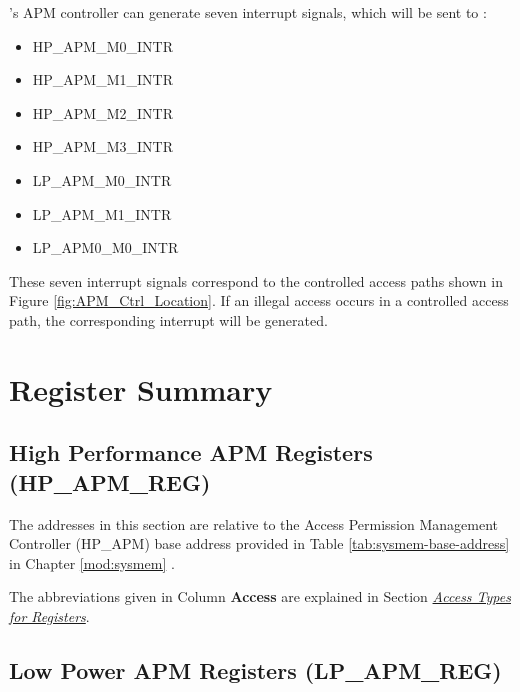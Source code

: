 \documentclass[main\_\_EN.tex]{subfiles}
\begin{document}
\chipname{}'s APM controller can generate seven interrupt signals, which will be sent to \textit{}:

    \begin{itemize}
    \item HP\_APM\_M0\_INTR
    \item HP\_APM\_M1\_INTR
    \item HP\_APM\_M2\_INTR
    \item HP\_APM\_M3\_INTR
    \item LP\_APM\_M0\_INTR
    \item LP\_APM\_M1\_INTR
    \item LP\_APM0\_M0\_INTR
    \end{itemize}
    
These seven interrupt signals correspond to the controlled access paths shown in Figure \ref{fig:APM_Ctrl_Location}. If an illegal access occurs in a controlled access path, the corresponding interrupt will be generated.



\hypertarget{permctrl-reg-summ}{}
\section{Register Summary}
\label{sec:permctrl-reg-summ}


\subsection{High Performance APM Registers (HP\_APM\_REG)}
\label{sec:permctrl-reg-hp}

The addresses in this section are relative to the Access Permission Management Controller (HP\_APM) base address provided in Table \ref{tab:sysmem-base-address} in Chapter \ref{mod:sysmem} \textit{}.

The abbreviations given in Column \textbf{Access} are explained in Section \hyperref[glossary-access-types]{\textit{Access Types for Registers}}.



\subsection{Low Power APM Registers (LP\_APM\_REG)}
\label{sec:permctrl-reg-lp}
\end{document}
